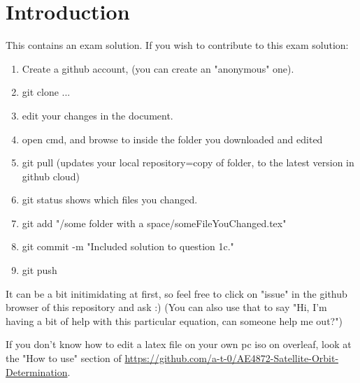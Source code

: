 \setcounter{section}{-1}
\section{Introduction}\label{sec:introduction}
This contains an exam solution. If you wish to contribute to this exam solution:
\begin{enumerate}
    \item Create a github account, (you can create an "anonymous" one).
    \item git clone ...
    \item edit your changes in the document.
    \item open cmd, and browse to inside the folder you downloaded and edited
    \item git pull (updates your local repository=copy of folder, to the latest version in github cloud)
    \item git status shows which files you changed.
    \item git add "/some folder with a space/someFileYouChanged.tex"
    \item git commit -m "Included solution to question 1c."
    \item git push
\end{enumerate}
It can be a bit initimidating at first, so feel free to click on "issue" in the github browser of this repository and ask :) (You can also use that to say "Hi, I'm having a bit of help with this particular equation, can someone help me out?")

If you don't know how to edit a latex file on your own pc iso on overleaf, look at the "How to use" section of \url{https://github.com/a-t-0/AE4872-Satellite-Orbit-Determination}.

